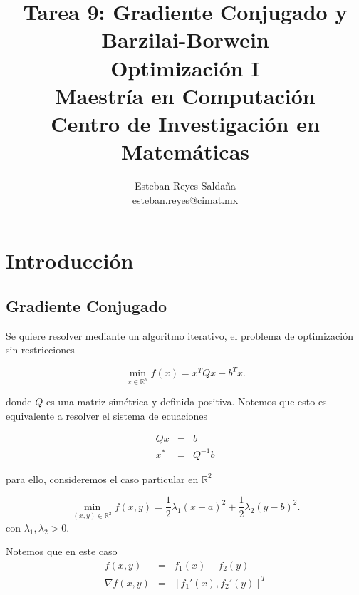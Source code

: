 \documentclass[11pt,letterpaper]{article}
\title{\textbf{Tarea 9: Gradiente Conjugado y Barzilai-Borwein}\\ Optimización I \\ \Large {Maestría en Computación}\\ \Large {Centro de Investigación en Matemáticas}}
\author{Esteban Reyes Saldaña \\ esteban.reyes@cimat.mx}
\theoremstyle{definition}
\theoremstyle{definition}
\theoremstyle{definition}
\begin{document}

\section{Introducción}
\subsection{Gradiente Conjugado}
Se quiere resolver mediante un algoritmo iterativo, el problema de optimización sin restricciones
\begin{shaded*}
	\begin{equation}
		\min_{x\in\mathbb{R}^n} f(x) =  x^T Q x - b^T x.
	\end{equation}
\end{shaded*}
donde $ Q $ es una matriz simétrica y definida positiva. Notemos que esto es equivalente a resolver el sistema de ecuaciones
\begin{shaded*}
	\begin{eqnarray*}
		Qx & = &  b \\
		x^*& = & Q^{-1} b
	\end{eqnarray*}
\end{shaded*}
para ello, consideremos el caso particular en $ \mathbb{R}^2 $
\begin{shaded*}
	\begin{equation}
		\min_{(x,y)\in\mathbb{R}^2} f(x, y) = \dfrac{1}{2} \lambda_1 (x - a)^2 + \dfrac{1}{2} \lambda_2 (y - b)^2.
	\end{equation}
	con $ \lambda_1, \lambda_2 > 0 $.
\end{shaded*}
Notemos que en este caso
\begin{eqnarray*}
	f(x, y) & = & f_1 (x) + f_2 (y) \\
	\nabla f(x,y) & = & \left[ f_1'(x), f_2'(y) \right]^T 
\end{eqnarray*}
\end{document}
